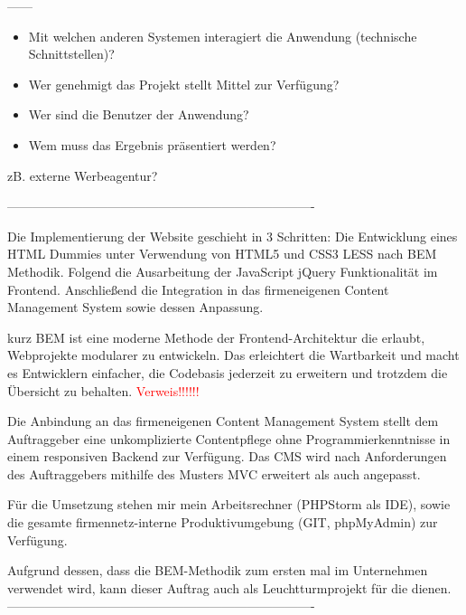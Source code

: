 ------

\begin{itemize}
	\item Mit welchen anderen Systemen interagiert die Anwendung (technische Schnittstellen)?
	\item Wer genehmigt das Projekt \bzw stellt Mittel zur Verfügung? 
	\item Wer sind die Benutzer der Anwendung?
	\item Wem muss das Ergebnis präsentiert werden?
\end{itemize}
zB. externe Werbeagentur?







-------------------------------------------------------------------------




Die Implementierung der Website geschieht in 3 Schritten: \newline
Die Entwicklung eines HTML Dummies unter Verwendung von \acs{HTML}5 und
\acs{CSS}3 \bzw  \acs{LESS} nach \acs{BEM} Methodik. Folgend die Ausarbeitung
der JavaScript \bzw jQuery Funktionalität im Frontend. Anschließend die Integration in 
das firmeneigenen Content Management System \ct sowie dessen Anpassung.






 kurz \acs{BEM} ist eine moderne Methode
der Frontend-Architektur die erlaubt, Webprojekte modularer zu entwickeln. Das erleichtert die Wartbarkeit und macht es
Entwicklern einfacher, die Codebasis jederzeit zu erweitern und trotzdem die Übersicht zu
behalten. \textcolor{red}{Verweis!!!!!!}

Die Anbindung an das firmeneigenen Content Management System \ct
stellt dem Auftraggeber eine unkomplizierte Contentpflege ohne Programmierkenntnisse in einem
responsiven Backend zur Verfügung. Das \acs{CMS} wird nach Anforderungen des
Auftraggebers mithilfe des Musters  \acs{MVC} erweitert
als auch angepasst.

Für die Umsetzung stehen mir mein Arbeitsrechner (PHPStorm als \acs{IDE}),
sowie die gesamte firmennetz-interne Produktivumgebung (\zB \acs{GIT}, phpMyAdmin) zur Verfügung.

Aufgrund dessen, dass die \acs{BEM}-Methodik zum ersten mal im Unternehmen
verwendet wird, kann dieser Auftrag auch als Leuchtturmprojekt für die \mh 
dienen.
-------------------------------------------------------------------------